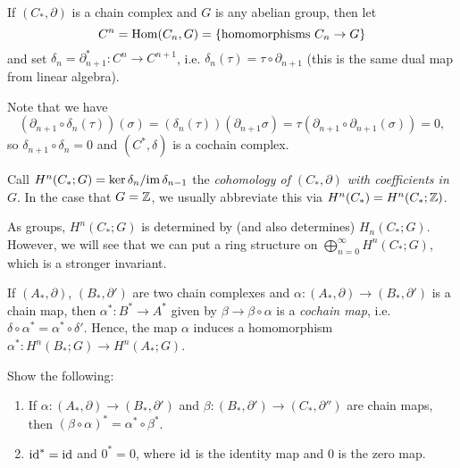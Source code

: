 \begin{definition}
  If $(C_*, \partial)$ is a chain complex and
  $G$ is any abelian group, then let
  \[
    C^n = \operatorname{Hom}(C_n, G) =
    \{\text{homomorphisms } C_n \to G\}
  \]
  and set $\delta_n = \partial_{n + 1}^* : C^n \to C^{n + 1}$,
  i.e. $\delta_n(\tau) = \tau \circ \partial_{n + 1}$ (this is the same dual map from linear algebra).
\end{definition}

\begin{remark}
  Note that we have
  \[
    (\partial_{n + 1} \circ \delta_n(\tau))(\sigma)
    = (\delta_n(\tau))(\partial_{n + 1} \sigma)
    = \tau(\partial_{n + 1} \circ \partial_{n + 1} (\sigma))
    = 0,
  \]
  so $\delta_{n + 1} \circ \delta_n = 0$
  and $(C^*, \delta)$ is a cochain complex.
\end{remark}

\begin{definition}
  Call $H^n(C_*; G) = \ker \delta_n / {\operatorname{im} \delta_{n - 1}}$
  the \emph{cohomology of $(C_*, \partial)$ with coefficients in $G$}. In the case that $G = \mathbb{Z}$,
  we usually abbreviate this via
  $H^n(C_*) = H^n(C_*; \mathbb{Z})$.
\end{definition}

\begin{remark}
  As groups, $H^n(C_*; G)$ is
  determined by (and also determines)
  $H_n(C_*; G)$. However, we will see that we can
  put a ring structure on $\bigoplus_{n = 0}^\infty H^n(C_*; G)$,
  which is a stronger invariant.
\end{remark}

\begin{definition}
  If $(A_*, \partial)$, $(B_*, \partial')$ are
  two chain complexes and
  $\alpha : (A_*, \partial) \to (B_*, \partial')$
  is a chain map, then $\alpha^* : B^* \to A^*$
  given by $\beta \to \beta \circ \alpha$ is a
  \emph{cochain map}, i.e.
  $\delta \circ \alpha^* = \alpha^* \circ \delta'$.
  Hence, the map $\alpha$ induces a homomorphism
  $\alpha^* : H^n(B_*; G) \to H^n(A_*; G)$.
\end{definition}

\begin{exercise}
  Show the following:
  \begin{enumerate}
    \item If $\alpha : (A_*, \partial) \to (B_*, \partial')$
      and $\beta : (B_*, \partial') \to (C_*, \partial'')$
      are chain maps, then
      $(\beta \circ \alpha)^* = \alpha^* \circ \beta^*$.
    \item $\operatorname{id}^* = \operatorname{id}$ and
      $0^* = 0$, where $\operatorname{id}$ is the identity map
      and $0$ is the zero map.
  \end{enumerate}
\end{exercise}

